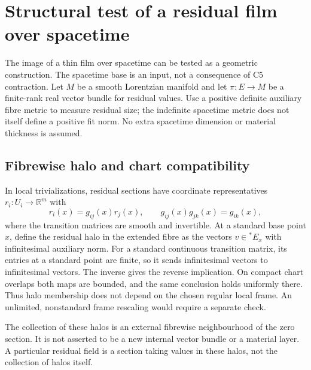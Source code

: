 \documentclass[11pt,a4paper]{article}
\begin{document}
\section{Structural test of a residual film over spacetime}
The image of a thin film over spacetime can be tested as a geometric
construction. The spacetime base is an input, not a consequence of C5
contraction. Let $M$ be a smooth Lorentzian manifold and let
$\pi:E\to M$ be a finite-rank real vector bundle for residual values.
Use a positive definite auxiliary fibre metric to measure residual size;
the indefinite spacetime metric does not itself define a positive fit norm.
No extra spacetime dimension or material thickness is assumed.

\subsection{Fibrewise halo and chart compatibility}
In local trivializations, residual sections have coordinate representatives
$r_i:U_i\to\mathbb R^m$ with
\[
r_i(x)=g_{ij}(x)r_j(x),\qquad
g_{ij}(x)g_{jk}(x)=g_{ik}(x),
\]
where the transition matrices are smooth and invertible.
At a standard base point $x$, define the residual halo in the extended fibre
as the vectors $v\in{}^*E_x$ with infinitesimal auxiliary norm.
For a standard continuous transition matrix, its entries at a standard
point are finite, so it sends infinitesimal vectors to infinitesimal vectors.
The inverse gives the reverse implication. On compact chart overlaps both
maps are bounded, and the same conclusion holds uniformly there.
Thus halo membership does not depend on the chosen regular local frame.
An unlimited, nonstandard frame rescaling would require a separate check.

The collection of these halos is an external fibrewise neighbourhood of the
zero section. It is not asserted to be a new internal vector bundle or a
material layer. A particular residual field is a section taking values in
these halos, not the collection of halos itself.
\end{document}
